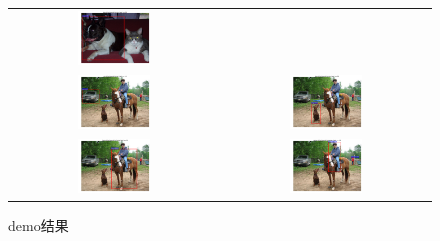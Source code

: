 \documentclass[a4paper, 12pt, UTF8]{article}
\begin{document}
\begin{figure}[ht!]
\begin{tabular}{cc}
        \includegraphics[width=0.36\textwidth]{figure_6.png} \\
        \includegraphics[width=0.36\textwidth]{figure_7.png} &
        \includegraphics[width=0.36\textwidth]{figure_8.png} \\
        \includegraphics[width=0.36\textwidth]{figure_9.png} &
        \includegraphics[width=0.36\textwidth]{figure_10.png} \\
    \end{tabular}
    \caption{demo结果}
    \label{figure_demo}
\end{figure}

\end{document}
